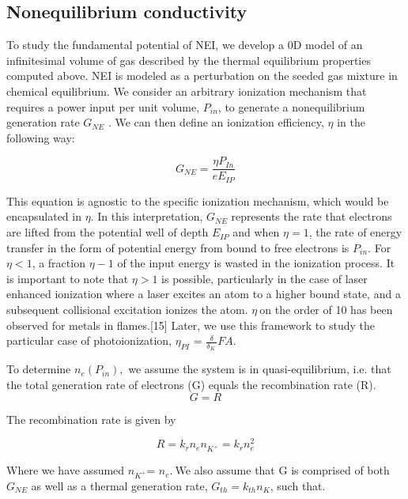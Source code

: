 \hypertarget{nonequilibrium-conductivity}{%
\subsection{Nonequilibrium conductivity}\label{nonequilibrium-conductivity}}

To study the fundamental potential of NEI, we develop a 0D model of an infinitesimal volume of gas described by the thermal equilibrium properties computed above. NEI is modeled as a perturbation on the seeded gas mixture in chemical equilibrium. We consider an arbitrary ionization mechanism that requires a power input per unit volume, \(P_{in}\), to generate a nonequilibrium generation rate \(G_{NE}\) . We can then define an ionization efficiency, \(\eta\) in the following way:

\begin{equation}
{G}_{NE} = \frac{\eta P_{In}}{eE_{IP}}
\end{equation}


This equation is agnostic to the specific ionization mechanism, which would be encapsulated in \(\eta\). In this interpretation, \(G_{NE}\) represents the rate that electrons are lifted from the potential well of depth \(E_{IP}\) and when \(\eta = 1\), the rate of energy transfer in the form of potential energy from bound to free electrons is \(P_{in}\). For \(\eta < 1\), a fraction \(\eta - 1\) of the input energy is wasted in the ionization process. It is important to note that \(\eta > 1\) is possible, particularly in the case of laser enhanced ionization where a laser excites an atom to a higher bound state, and a subsequent collisional excitation ionizes the atom. \(\eta\ \)on the order of 10 has been observed for metals in flames.{[}15{]} Later, we use this framework to study the particular case of photoionization, \(\eta_{PI}\) = \(\frac{\delta}{\delta_{K}\ }FA\).

To determine \(n_{e}(P_{in}),\) we assume the system is in quasi-equilibrium, i.e. that the total generation rate of electrons (G) equals the recombination rate (R).
\begin{equation}
G = R
\end{equation}

The recombination rate is given by

\begin{equation}
R = k_{r}n_{e}n_{K^{+}} = k_{r}n_{e}^{2}
\end{equation}

Where we have assumed \(n_{K^{+}}\)= \(n_{e}.\ \)We also assume that G is comprised of both \(G_{NE}\) as well as a thermal generation rate, \(G_{th} = k_{th}n_{K}\), such that.


